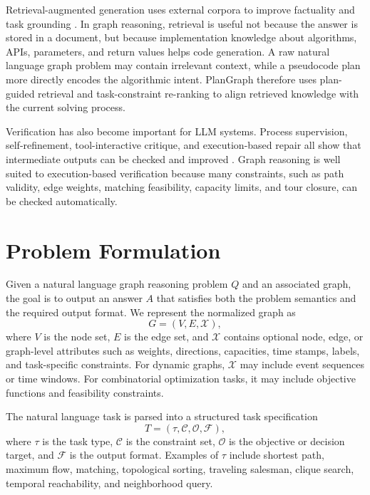 \documentclass[pdflatex,sn-mathphys-num]{sn-jnl}
\theoremstyle{thmstyleone}
\theoremstyle{thmstyletwo}
\theoremstyle{thmstylethree}
\begin{document}
Retrieval-augmented generation uses external corpora to improve factuality and task grounding \cite{karpukhin2020dpr,lewis2020rag,izacard2023atlas,gao2024ragsurvey}. In graph reasoning, retrieval is useful not because the answer is stored in a document, but because implementation knowledge about algorithms, APIs, parameters, and return values helps code generation. A raw natural language graph problem may contain irrelevant context, while a pseudocode plan more directly encodes the algorithmic intent. PlanGraph therefore uses plan-guided retrieval and task-constraint re-ranking to align retrieved knowledge with the current solving process.

Verification has also become important for LLM systems. Process supervision, self-refinement, tool-interactive critique, and execution-based repair all show that intermediate outputs can be checked and improved \cite{madaan2023selfrefine,lightman2023processreward,critic2024}. Graph reasoning is well suited to execution-based verification because many constraints, such as path validity, edge weights, matching feasibility, capacity limits, and tour closure, can be checked automatically.

\section{Problem Formulation}\label{sec:problem}

Given a natural language graph reasoning problem $Q$ and an associated graph, the goal is to output an answer $A$ that satisfies both the problem semantics and the required output format. We represent the normalized graph as
\begin{equation}
G=(V,E,\mathcal{X}),
\end{equation}
where $V$ is the node set, $E$ is the edge set, and $\mathcal{X}$ contains optional node, edge, or graph-level attributes such as weights, directions, capacities, time stamps, labels, and task-specific constraints. For dynamic graphs, $\mathcal{X}$ may include event sequences or time windows. For combinatorial optimization tasks, it may include objective functions and feasibility constraints.

The natural language task is parsed into a structured task specification
\begin{equation}
T=(\tau,\mathcal{C},\mathcal{O},\mathcal{F}),
\end{equation}
where $\tau$ is the task type, $\mathcal{C}$ is the constraint set, $\mathcal{O}$ is the objective or decision target, and $\mathcal{F}$ is the output format. Examples of $\tau$ include shortest path, maximum flow, matching, topological sorting, traveling salesman, clique search, temporal reachability, and neighborhood query.
\end{document}
